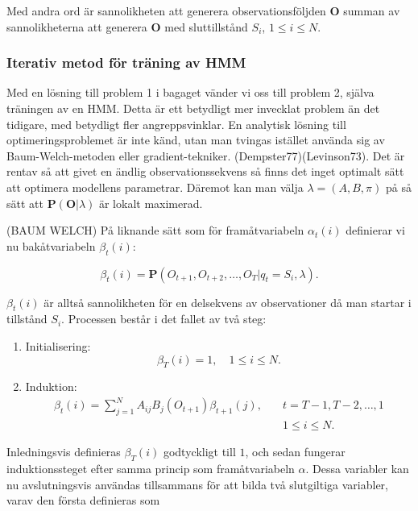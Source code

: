\documentclass[../rapport_MVEX01-11-05]{subfiles}
\begin{document}
Med andra ord är sannolikheten att generera observationsföljden
$\textbf{O}$ summan av sannolikheterna att generera $\textbf{O}$ med
sluttillstånd $S_i$, $1 \leq i \leq N$.

\subsubsection{Iterativ metod för träning av HMM}

Med en lösning till problem 1 i bagaget vänder vi oss till problem 2,
själva träningen av en HMM. Detta är ett betydligt mer invecklat
problem än det tidigare, med betydligt fler angreppsvinklar. En
analytisk lösning till optimeringsproblemet är inte känd, utan man
tvingas istället använda sig av Baum-Welch-metoden eller
gradient-tekniker. (Dempster77)(Levinson73). Det är rentav så att
givet en ändlig observationssekvens så finns det inget optimalt sätt
att optimera modellens parametrar. Däremot kan man välja $\lambda =
(A,B,\pi)$ på så sätt att $\textbf{P}(\textbf{O}|\lambda)$ är lokalt
maximerad. 


(BAUM WELCH) På liknande sätt som för framåtvariabeln $\alpha_t(i)$
definierar vi nu bakåtvariabeln $\beta_t(i)$: 

\begin{equation*}
\beta_t(i) = \textbf{P}(O_{t+1},O_{t+2},\dots,O_T | q_t = S_i, \lambda).
\end{equation*} 

$\beta_t(i)$ är alltså sannolikheten för en delsekvens av
observationer då man startar i tillstånd $S_i$. Processen består i det
fallet av två steg:

\begin{enumerate}
\item Initialisering: 
\begin{equation*}
\beta_T(i) = 1, \quad 1 \leq i \leq N.
\end{equation*}
\item Induktion: 
\begin{align*}
\beta_t(i) = \sum\limits_{j=1}^NA_{ij}B_j(O_{t+1})\beta_{t+1}(j), \quad &t =
T-1,T-2,\dots,1 \\
&1 \leq i \leq N.
\end{align*}
\end{enumerate}  

Inledningsvis definieras $\beta_T(i)$ godtyckligt till $1$, och sedan
fungerar induktionssteget efter samma princip som framåtvariabeln
$\alpha$. Dessa variabler kan nu avslutningsvis användas tillsammans
för att bilda två slutgiltiga variabler, varav den första definieras som 
\end{document}
